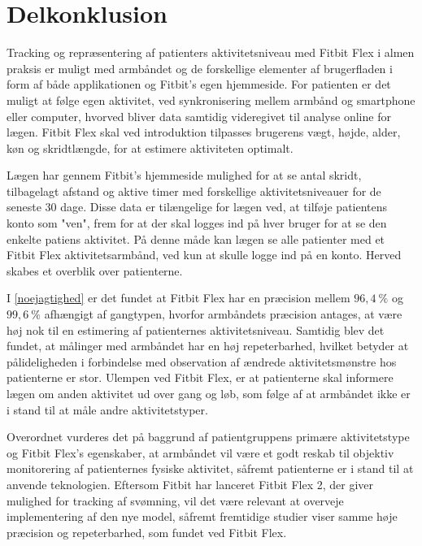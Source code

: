 \section{Delkonklusion}

Tracking og repræsentering af patienters aktivitetsniveau med Fitbit Flex i almen praksis er muligt med armbåndet og de forskellige elementer af brugerfladen i form af både applikationen og Fitbit's egen hjemmeside. For patienten er det muligt at følge egen aktivitet, ved synkronisering mellem armbånd og smartphone eller computer, hvorved bliver data samtidig videregivet til analyse online for lægen. Fitbit Flex skal ved introduktion tilpasses brugerens vægt, højde, alder, køn og skridtlængde, for at estimere aktiviteten optimalt.

Lægen har gennem Fitbit's hjemmeside mulighed for at se antal skridt, tilbagelagt afstand og aktive timer med forskellige aktivitetsniveauer for de seneste $30$ dage. Disse data er tilængelige for lægen ved, at tilføje patientens konto som "ven", frem for at der skal logges ind på hver bruger for at se den enkelte patiens aktivitet. På denne måde kan lægen se alle patienter med et Fitbit Flex aktivitetsarmbånd, ved kun at skulle logge ind på en konto. Herved skabes et overblik over patienterne. 

I \ref{noejagtighed} er det fundet at Fitbit Flex har en præcision mellem $96,4~\%$ og $99,6~\%$ afhængigt af gangtypen, hvorfor armbåndets præcision antages, at være høj nok til en estimering af patienternes aktivitetsniveau. Samtidig blev det fundet, at målinger med armbåndet har en høj repeterbarhed, hvilket betyder at pålideligheden i forbindelse med observation af ændrede aktivitetsmønstre hos patienterne er stor. Ulempen ved Fitbit Flex, er at patienterne skal informere lægen om anden aktivitet ud over gang og løb, som følge af at armbåndet ikke er i stand til at måle andre aktivitetstyper.

Overordnet vurderes det på baggrund af patientgruppens primære aktivitetstype og Fitbit Flex's egenskaber, at armbåndet vil være et godt reskab til objektiv monitorering af patienternes fysiske aktivitet, såfremt patienterne er i stand til at anvende teknologien. Eftersom Fitbit har lanceret Fitbit Flex 2, der giver mulighed for tracking af svømning, vil det være relevant at overveje implementering af den nye model, såfremt fremtidige studier viser samme høje præcision og repeterbarhed, som fundet ved Fitbit Flex.